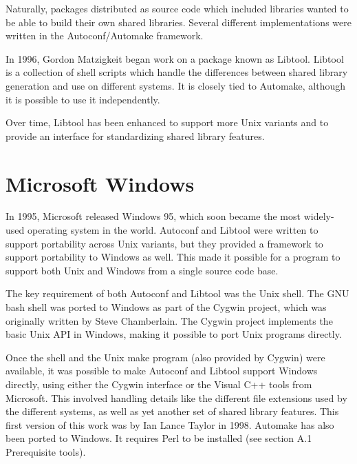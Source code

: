 Naturally, packages distributed as source code which included libraries wanted to be able to build their own shared libraries. Several different implementations were written in the Autoconf/Automake framework. 


In 1996, Gordon Matzigkeit began work on a package known as Libtool. Libtool is a collection of shell scripts which handle the differences between shared library generation and use on different systems. It is closely tied to Automake, although it is possible to use it independently. 


Over time, Libtool has been enhanced to support more Unix variants and to provide an interface for standardizing shared library features.

\section{Microsoft Windows}


In 1995, Microsoft released Windows 95, which soon became the most widely-used operating system in the world. Autoconf and Libtool were written to support portability across Unix variants, but they provided a framework to support portability to Windows as well. This made it possible for a program to support both Unix and Windows from a single source code base. 


The key requirement of both Autoconf and Libtool was the Unix shell. The GNU bash shell was ported to Windows as part of the Cygwin project, which was originally written by Steve Chamberlain. The Cygwin project implements the basic Unix API in Windows, making it possible to port Unix programs directly. 


Once the shell and the Unix make program (also provided by Cygwin) were available, it was possible to make Autoconf and Libtool support Windows directly, using either the Cygwin interface or the Visual C++ tools from Microsoft. This involved handling details like the different file extensions used by the different systems, as well as yet another set of shared library features. This first version of this work was by Ian Lance Taylor in 1998. Automake has also been ported to Windows. It requires Perl to be installed (see section A.1 Prerequisite tools). 
